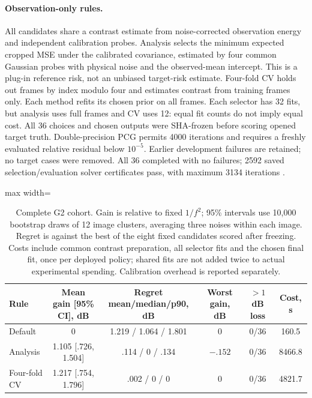 \paragraph{Observation-only rules.} All candidates share a contrast
estimate from noise-corrected observation energy and independent
calibration probes. Analysis selects the minimum expected cropped MSE
under the calibrated covariance, estimated by four common Gaussian probes
with physical noise and the observed-mean intercept. This is a plug-in
reference risk, not an unbiased target-risk estimate. Four-fold CV holds
out frames by index modulo four and estimates contrast from training frames
only. Each method refits its chosen prior on all frames. Each selector has
32 fits, but analysis uses full frames and CV uses 12: equal fit counts do
not imply equal cost. All 36 choices and chosen outputs were SHA-frozen
before scoring opened target truth. Double-precision PCG permits 4000
iterations and requires a freshly evaluated relative residual below
$10^{-5}$. Earlier development failures are retained; no target cases were
removed. All 36 completed with no failures; 2592 saved selection/evaluation
solver certificates pass, with maximum 3134 iterations .

\begin{table}[t]\centering\small
\caption{Complete G2 cohort. Gain is relative to fixed $1/f^2$;
95\% intervals use 10,000 bootstrap draws of 12 image clusters, averaging
three noises within each image. Regret is against the best of the eight
fixed candidates scored after freezing. Costs include common contrast
preparation, all selector fits and the chosen final fit, once per deployed
policy; shared fits are not added twice to actual experimental spending.
Calibration overhead is reported separately.}\label{tab:g2}
\begin{adjustbox}{max width=\textwidth}\begin{tabular}{lccccc}\toprule
Rule & Mean gain [95\% CI], dB & Regret mean/median/p90, dB & Worst gain, dB & $>1$ dB loss & Cost, s\\\midrule
Default & 0 & 1.219 / 1.064 / 1.801 & 0 & 0/36 & 160.5\\
Analysis & 1.105 [.726, 1.504] & .114 / 0 / .134 & $-.152$ & 0/36 & 8466.8\\
Four-fold CV & 1.217 [.754, 1.796] & .002 / 0 / 0 & 0 & 0/36 & 4821.7\\\bottomrule
\end{tabular}\end{adjustbox}
\end{table}

